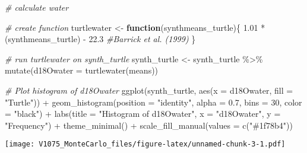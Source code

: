 \documentclass[
]{article}
\newenvironment{Shaded}{\begin{snugshade}}{\end{snugshade}}
\newcommand{\AttributeTok}[1]{\textcolor[rgb]{0.77,0.63,0.00}{#1}}
\newcommand{\CommentTok}[1]{\textcolor[rgb]{0.56,0.35,0.01}{\textit{#1}}}
\newcommand{\ControlFlowTok}[1]{\textcolor[rgb]{0.13,0.29,0.53}{\textbf{#1}}}
\newcommand{\DecValTok}[1]{\textcolor[rgb]{0.00,0.00,0.81}{#1}}
\newcommand{\FloatTok}[1]{\textcolor[rgb]{0.00,0.00,0.81}{#1}}
\newcommand{\FunctionTok}[1]{\textcolor[rgb]{0.00,0.00,0.00}{#1}}
\newcommand{\NormalTok}[1]{#1}
\newcommand{\OtherTok}[1]{\textcolor[rgb]{0.56,0.35,0.01}{#1}}
\newcommand{\SpecialCharTok}[1]{\textcolor[rgb]{0.00,0.00,0.00}{#1}}
\newcommand{\StringTok}[1]{\textcolor[rgb]{0.31,0.60,0.02}{#1}}
\begin{document}
\begin{Shaded}
\begin{Highlighting}[]
\CommentTok{\# calculate water}

  \CommentTok{\# create function}
\NormalTok{    turtlewater }\OtherTok{\textless{}{-}} \ControlFlowTok{function}\NormalTok{(synthmeans\_turtle)\{}
      \FloatTok{1.01} \SpecialCharTok{*}\NormalTok{(synthmeans\_turtle) }\SpecialCharTok{{-}} \FloatTok{22.3} \CommentTok{\#Barrick et al. (1999)}
\NormalTok{    \}}

  \CommentTok{\# run turtlewater on synth\_turtle}
\NormalTok{    synth\_turtle }\OtherTok{\textless{}{-}}\NormalTok{ synth\_turtle }\SpecialCharTok{\%\textgreater{}\%}
      \FunctionTok{mutate}\NormalTok{(}\AttributeTok{d18Owater =} \FunctionTok{turtlewater}\NormalTok{(means))}

\CommentTok{\# Plot histogram of d18Owater}
  \FunctionTok{ggplot}\NormalTok{(synth\_turtle, }\FunctionTok{aes}\NormalTok{(}\AttributeTok{x =}\NormalTok{ d18Owater, }\AttributeTok{fill =} \StringTok{"Turtle"}\NormalTok{)) }\SpecialCharTok{+}
    \FunctionTok{geom\_histogram}\NormalTok{(}\AttributeTok{position =} \StringTok{"identity"}\NormalTok{, }\AttributeTok{alpha =} \FloatTok{0.7}\NormalTok{, }\AttributeTok{bins =} \DecValTok{30}\NormalTok{, }\AttributeTok{color =} \StringTok{"black"}\NormalTok{) }\SpecialCharTok{+}
    \FunctionTok{labs}\NormalTok{(}\AttributeTok{title =} \StringTok{"Histogram of d18Owater"}\NormalTok{,}
         \AttributeTok{x =} \StringTok{"d18Owater"}\NormalTok{,}
         \AttributeTok{y =} \StringTok{"Frequency"}\NormalTok{) }\SpecialCharTok{+}
    \FunctionTok{theme\_minimal}\NormalTok{() }\SpecialCharTok{+}
    \FunctionTok{scale\_fill\_manual}\NormalTok{(}\AttributeTok{values =} \FunctionTok{c}\NormalTok{(}\StringTok{"\#1f78b4"}\NormalTok{))}
\end{Highlighting}
\end{Shaded}

\texttt{[image: V1075\_MonteCarlo\_files/figure-latex/unnamed-chunk-3-1.pdf]}
\end{document}
